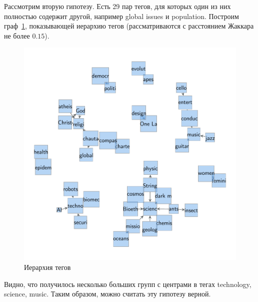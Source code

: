 \documentclass[12pt,a4paper]{scrartcl}
\begin{document}
Рассмотрим вторую гипотезу. Есть 29 пар тегов, для которых один из них полностью содержит другой, например global issues и population. Построим граф~\ref{tags_graph}, показывающей иерархию тегов (рассматриваются с расстоянием Жаккара не более $0.15$).
\begin{figure}[hbp]
\includegraphics{tags_graph.pdf}
\caption{Иерархия тегов}
\label{tags_graph}
\end{figure}
Видно, что получилось несколько больших групп с центрами в тегах technology, science, music. Таким образом, можно считать эту гипотезу верной.
\end{document}
